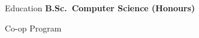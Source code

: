 \begin{rubric}{Education}
%
	\textbf{B.Sc.~Computer Science (Honours)}\par
	        Co-op Program
\end{rubric}